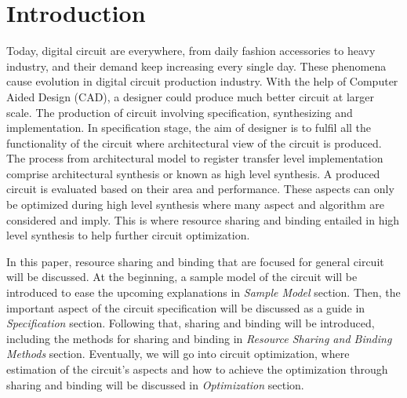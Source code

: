 \section{Introduction}


Today, digital circuit are everywhere, from daily fashion accessories to heavy industry, and their demand keep increasing every single day. These phenomena cause evolution in digital circuit production industry. With the help of Computer Aided Design (CAD), a designer could produce much better circuit at larger scale. The production of circuit involving specification, synthesizing and implementation. In specification stage, the aim of designer is to fulfil all the  functionality of the circuit where architectural view of the circuit is produced. The process from architectural model to register transfer level implementation comprise architectural synthesis or known as high level synthesis. A produced circuit is evaluated based on their area and performance. These aspects can only be optimized during high level synthesis where many aspect and algorithm are considered and imply. This is where resource sharing and binding entailed in high level synthesis to help further circuit optimization.

In this paper, resource sharing and binding that are focused for general circuit will be discussed. At the beginning, a sample model of the circuit will be introduced to ease the upcoming explanations in \textit{Sample Model} section. Then, the important aspect of the circuit specification will be discussed as a guide in \textit{Specification} section. Following that, sharing and binding will be introduced, including the methods for sharing and binding in \textit{Resource Sharing and Binding Methods} section. Eventually, we will go into circuit optimization, where estimation of the circuit's aspects and how to achieve the optimization through sharing and binding will be discussed in \textit{Optimization} section.
